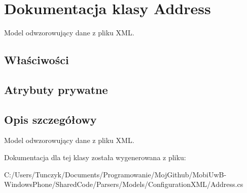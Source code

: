 \hypertarget{a00004}{}\section{Dokumentacja klasy Address}
\label{a00004}


Model odwzorowujący dane z pliku X\+M\+L.  


\subsection*{Właściwości}
\subsection*{Atrybuty prywatne}


\subsection{Opis szczegółowy}
Model odwzorowujący dane z pliku X\+M\+L. 



Dokumentacja dla tej klasy została wygenerowana z pliku\+:\begin{DoxyCompactItemize}
\item 
C\+:/\+Users/\+Tunczyk/\+Documents/\+Programowanie/\+Moj\+Github/\+Mobi\+Uw\+B-\/\+Windows\+Phone/\+Shared\+Code/\+Parsers/\+Models/\+Configuration\+X\+M\+L/Address.\+cs\end{DoxyCompactItemize}
